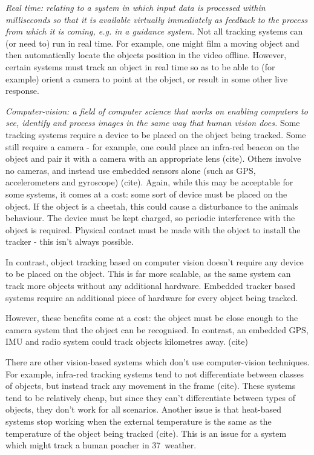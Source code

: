 \textit{Real time: relating to a system in which input data is processed within milliseconds so that it is available virtually immediately as feedback to the process from which it is coming, e.g. in a guidance system.}
%
Not all tracking systems can (or need to) run in real time. For example, one might film a moving object and then automatically locate the objects position in the video offline. However, certain systems must track an object in real time so as to be able to (for example) orient a camera to point at the object, or result in some other live response.


\textit{Computer-vision: a field of computer science that works on enabling computers to see, identify and process images in the same way that human vision does.}
%
Some tracking systems require a device to be placed on the object being tracked. Some still require a camera - for example, one could place an infra-red beacon on the object and pair it with a camera with an appropriate lens {\color{red} (cite)}. Others involve no cameras, and instead use embedded sensors alone (such as GPS, accelerometers and gyroscope) {\color{red} (cite)}. Again, while this may be acceptable for some systems, it comes at a cost: some sort of device must be placed on the object. If the object is a cheetah, this could cause a disturbance to the animals behaviour. The device must be kept charged, so periodic interference with the object is required. Physical contact must be made with the object to install the tracker - this isn't always possible.

In contrast, object tracking based on computer vision doesn't require any device to be placed on the object. This is far more scalable, as the same system can track more objects without any additional hardware. Embedded tracker based systems require an additional piece of hardware for every object being tracked.

However, these benefits come at a cost: the object must be close enough to the camera system that the object can be recognised. In contrast, an embedded GPS, IMU and radio system could track objects kilometres away. {\color{red} (cite)}

There are other vision-based systems which don't use computer-vision techniques. For example, infra-red tracking systems tend to not differentiate between classes of objects, but instead track any movement in the frame {\color{red} (cite)}. These systems tend to be relatively cheap, but since they can't differentiate between types of objects, they don't work for all scenarios. Another issue is that heat-based systems stop working when the external temperature is the same as the temperature of the object being tracked {\color{red} (cite)}. This is an issue for a system which might track a human poacher in 37\textdegree\ weather.

